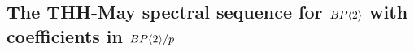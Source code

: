 \begin{comment}
Note that $\lambda_2$ is in the kernel of the natural map in homology induced by 
\[
\THH(\B)\to \THH(\Z_p).
\]
Thus $\lambda_2$ is in positive May filtration. Thus, $\otau_2$ must support a differential. The only possibility is the the following differential
\[
d^{4}\otau_2 \dot{=} v_2.
\]
As we have already computed the $E^2$-page, the class $\mu_1^2\, \sigma v_1$ cannot be hit by a differential, and there are no classes for it to hit. Thus, this class will represent a non-zero permanent cycle in the $E^\infty$-term and detects $\lambda_2$. Consequently, $\sigma v_2$ must be the target of a differential. This results in the differential 
\[
d^{4}\mu_1^3\dot{=} \sigma v_2.
\] 
These and the multiplicative structure of the spectral sequence accounts for all $d^{p+1}$-differentials. This results in 
\[
E^{5}\cong E(\otau_0)\otimes \AE{2}\otimes E(\lambda_1, \mu_1^3\, \sigma v_1, \mu_1^6\, \sigma v_2 )\otimes P(\mu_1^9).
\]
\end{proof}

We can infer from the description of the $E^{p+2}$ that the $H\wedge V(0)$-based THH-May spectral collapses at this page. 


We have already shown that $\mu_1^3\sigma v_1$ detects $\lambda_2$. We also have, 
\begin{prop}
	The class $\mu_1^6\sigma v_2$ detects $\lambda_3$ and the class $\mu_1^9$ detects $\mu_3$.
\end{prop}
\begin{proof}
	A direct computation with B\"okstedt spectral sequence for the morphism
	\[
	\THH(\B)\to \THH(\Z_p)
	\]
	shows that $\mu_3$ is mapped to $\mu_1^9$ in homology. Thus $\mu_1^9$ detects $\mu_3$ in the May spectral sequence. \todo{finish this proof}
\end{proof}
\end{comment}
\subsection{The THH-May spectral sequence for $BP\langle 2 \rangle$ with coefficients in $BP\langle 2 \rangle/p$}

